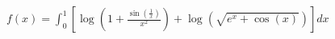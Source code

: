 \documentclass[preview]{standalone}
\begin{document}
\begin{center}
$f(x) = \int_{0}^{1} \left[ \log\left( 1 + \frac{\sin\left( \frac{1}{x} \right)}{x^2} \right) + \log\left( \sqrt{e^x + \cos(x)} \right) \right] dx$
\end{center}
\end{document}
